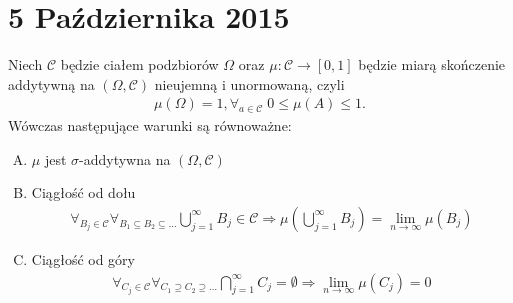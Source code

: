 \chapter{5 Października 2015}
\begin{twr}
Niech $ \mathcal C $ będzie ciałem podzbiorów $ \Omega $ oraz $ \mu:\mathcal C\to\left[0,1\right] $ będzie miarą skończenie addytywną na $ \left(\Omega,\mathcal C\right) $ nieujemną i unormowaną, czyli 
\begin{gather*}
\mu(\Omega)=1,\forall_{a\in\mathcal C}\; 0\le\mu(A)\le 1.
\end{gather*} Wówczas następujące warunki są równoważne:
\begin{enumerate}[(A)]
\item $ \mu $ jest $\sigma$-addytywna na $ \left(\Omega,\mathcal C\right) $
\item Ciągłość od dołu
\begin{gather*}
\forall_{B_j\in\mathcal C}\forall_{B_1\subseteq B_2\subseteq \dots} \bigcup_{j=1}^\infty B_j\in\mathcal C 
\Rightarrow
\mu \left(\bigcup_{j=1}^\infty B_j\right)=\lim\limits_{n\to\infty} \mu \left(B_j\right)
\end{gather*}
\item Ciągłość od góry
\begin{gather*}
\forall_{C_j\in\mathcal C}\forall_{C_1\supseteq C_2\supseteq \dots}
\bigcap_{j=1}^\infty C_j=\emptyset
\Rightarrow
\lim\limits_{n\to\infty} \mu \left(C_j\right)=0
\end{gather*}
\end{enumerate}
\end{twr}
